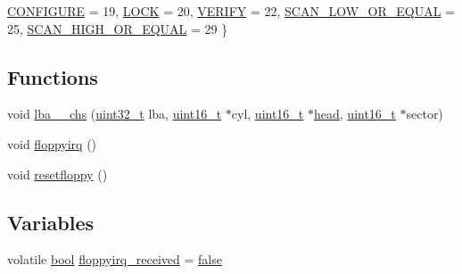 \begin{DoxyCompactItemize}
\hyperlink{a00029_a9990a5de334fdaec2ce93b74b8676148_a9990a5de334fdaec2ce93b74b8676148a5183723f609e1521f38450e9792af61d}{C\+O\+N\+F\+I\+G\+U\+RE} = 19, 
\hyperlink{a00029_a9990a5de334fdaec2ce93b74b8676148_a9990a5de334fdaec2ce93b74b8676148a438b68412f24003b09e0993b62dc7b48}{L\+O\+CK} = 20, 
\hyperlink{a00029_a9990a5de334fdaec2ce93b74b8676148_a9990a5de334fdaec2ce93b74b8676148a570b000ad5bd233482644aaaac095680}{V\+E\+R\+I\+FY} = 22, 
\hyperlink{a00029_a9990a5de334fdaec2ce93b74b8676148_a9990a5de334fdaec2ce93b74b8676148a7eefaec5fabe1db94fd12a84af66b6cd}{S\+C\+A\+N\+\_\+\+L\+O\+W\+\_\+\+O\+R\+\_\+\+E\+Q\+U\+AL} = 25, 
\newline
\hyperlink{a00029_a9990a5de334fdaec2ce93b74b8676148_a9990a5de334fdaec2ce93b74b8676148a1ee024a89ac2dbd7845f63306f175546}{S\+C\+A\+N\+\_\+\+H\+I\+G\+H\+\_\+\+O\+R\+\_\+\+E\+Q\+U\+AL} = 29
 \}
\end{DoxyCompactItemize}
\subsection*{Functions}
\begin{DoxyCompactItemize}
\item 
void \hyperlink{a00029_a782ff57a4ec7786197ec3a12d4f52332_a782ff57a4ec7786197ec3a12d4f52332}{lba\+\_\+\_\+chs} (\hyperlink{a00140_a435d1572bf3f880d55459d9805097f62_a435d1572bf3f880d55459d9805097f62}{uint32\+\_\+t} lba, \hyperlink{a00140_a273cf69d639a59973b6019625df33e30_a273cf69d639a59973b6019625df33e30}{uint16\+\_\+t} $\ast$cyl, \hyperlink{a00140_a273cf69d639a59973b6019625df33e30_a273cf69d639a59973b6019625df33e30}{uint16\+\_\+t} $\ast$\hyperlink{a00167_ac630e1c7e5feeaaf43837648134a0c6d_ac630e1c7e5feeaaf43837648134a0c6d}{head}, \hyperlink{a00140_a273cf69d639a59973b6019625df33e30_a273cf69d639a59973b6019625df33e30}{uint16\+\_\+t} $\ast$sector)
\item 
void \hyperlink{a00029_acbe17688655526c3fa02f324ae8336ca_acbe17688655526c3fa02f324ae8336ca}{floppyirq} ()
\item 
void \hyperlink{a00029_ad64d38a767bc5f30a3e13a5b01b9cf35_ad64d38a767bc5f30a3e13a5b01b9cf35}{resetfloppy} ()
\end{DoxyCompactItemize}
\subsection*{Variables}
\begin{DoxyCompactItemize}
\item 
volatile \hyperlink{a00140_af6a258d8f3ee5206d682d799316314b1_af6a258d8f3ee5206d682d799316314b1}{bool} \hyperlink{a00029_a2cfa75d25a7da8cb54551c7840e80d40_a2cfa75d25a7da8cb54551c7840e80d40}{floppyirq\+\_\+received} = \hyperlink{a00140_af6a258d8f3ee5206d682d799316314b1_af6a258d8f3ee5206d682d799316314b1ae9de385ef6fe9bf3360d1038396b884c}{false}
\end{DoxyCompactItemize}


